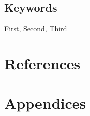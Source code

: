 \documentclass[11pt,        %
  ngerman,english,          %
  paper=a4,                 %
  captions=tablesignature,  %
  listof=numbered,          %
  bibliography=totoc,       %
  headings=small,           %
  headinclude=false,        %
  footinclude=false,        %
  parskip=half-,            %
  oneside,                  %
  BCOR=15mm,                %
  DIV=12                    %
  ]{scrbook}                %
\begin{document}
\section*{Keywords} First, Second, Third
\clearpage
\setcounter{tocdepth}{1}
\tableofcontents

\mainmatter



\backmatter

\cleardoublepage
{}
\listoffigures

\cleardoublepage
{}
\listoftables

\cleardoublepage
{}
\lstlistoflistings

\chapter{References}\label{sec:references}
\renewcommand{\bibname}{References}



\glsaddall
\printglossary[type=\acronymtype,title=List of Abbreviations,style=imaiabk,toctitle=List of Abbreviations]
\printglossary[style=imai]

\renewcommand{\thechapter}{\Alph{chapter}}
\renewcommand{\thesection}{\Alph{section}}
\renewcommand{\thesubsection}{\Alph{section}.\arabic{subsection}}
\setcounter{section}{0}
\addtocounter{chapter}{1}

\chapter{Appendices}\label{chapter:appendix}
\end{document}
